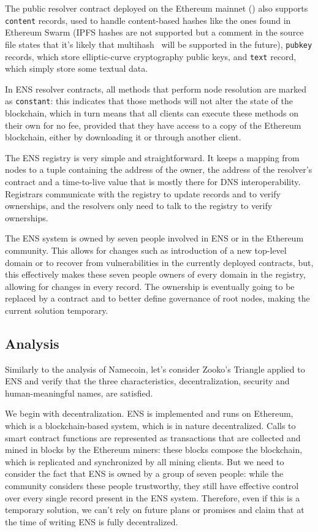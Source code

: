 \documentclass[mscthesis]{usiinfthesis}
\begin{document}
The public resolver contract deployed on the Ethereum mainnet (\cite{enspublicresolver}) also supports \texttt{content} records, used to handle content-based hashes like the ones found in Ethereum Swarm (IPFS hashes are not supported but a comment in the source file states that it's likely that multihash~\cite{multihash} will be supported in the future), %
\texttt{pubkey} records, which store elliptic-curve cryptography public keys, and \texttt{text} record, which simply store some textual data.

In ENS resolver contracts, all methods that perform node resolution are marked as \texttt{constant}: this indicates that those methods will not alter the state of the blockchain, which in turn means that all clients can execute these methods on their own for no fee, provided that they have access to a copy of the Ethereum blockchain, either by downloading it or through another client.

The ENS registry is very simple and straightforward. It keeps a mapping from nodes to a tuple containing the address of the owner, the address of the resolver's contract and a time-to-live value that is mostly there for DNS interoperability. Registrars communicate with the registry to update records and to verify ownerships, and the resolvers only need to talk to the registry to verify ownerships.

The ENS system is owned by seven people involved in ENS or in the Ethereum community. This allows for changes such as introduction of a new top-level domain or to recover from vulnerabilities in the currently deployed contracts, but, this effectively makes these seven people owners of every domain in the registry, allowing for changes in every record. The ownership is eventually going to be replaced by a contract and to better define governance of root nodes, making the current solution temporary. %

\subsection{Analysis}

Similarly to the analysis of Namecoin, let's consider Zooko's Triangle applied to ENS and verify that the three characteristics, decentralization, security and human-meaningful names, are satisfied.

We begin with decentralization. ENS is implemented and runs on Ethereum, which is a blockchain-based system, which is in nature decentralized. Calls to smart contract functions are represented as transactions that are collected and mined in blocks by the Ethereum miners: these blocks compose the blockchain, which is replicated and synchronized by all mining clients. But we need to consider the fact that ENS is owned by a group of seven people: while the community considers these people trustworthy, they still have effective control over every single record present in the ENS system. Therefore, even if this is a temporary solution, we can't rely on future plans or promises and claim that at the time of writing ENS is fully decentralized.
\end{document}
